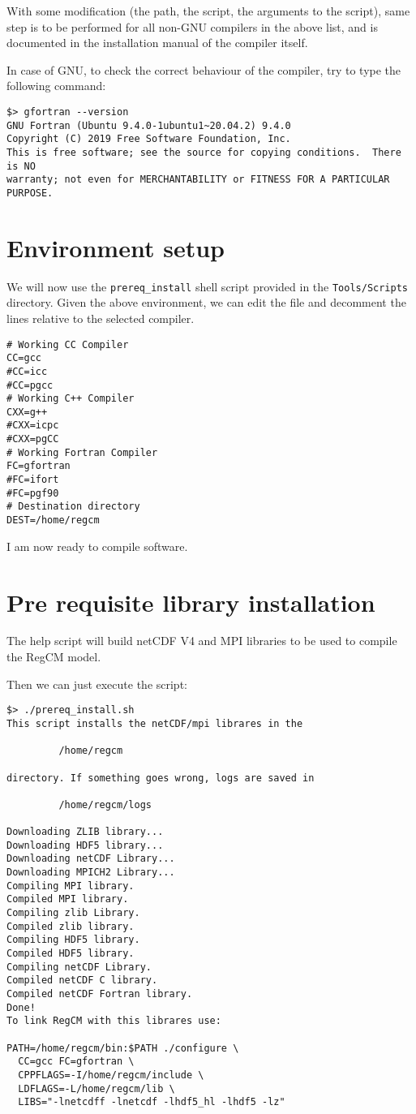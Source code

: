 With some modification (the path, the script, the arguments to the script),
same step is to be performed for all non-GNU compilers in the above list, and
is documented in the installation manual of the compiler itself.

In case of GNU, to check the correct behaviour of the compiler, try to
type the following command:

\begin{Verbatim}
$> gfortran --version
GNU Fortran (Ubuntu 9.4.0-1ubuntu1~20.04.2) 9.4.0
Copyright (C) 2019 Free Software Foundation, Inc.
This is free software; see the source for copying conditions.  There is NO
warranty; not even for MERCHANTABILITY or FITNESS FOR A PARTICULAR PURPOSE.

\end{Verbatim}

\section{Environment setup}

We will now use the \verb=prereq_install= shell script provided in the
\verb=Tools/Scripts= directory. Given the above environment, we can edit
the file and decomment the lines relative to the selected compiler.

\begin{Verbatim}
# Working CC Compiler
CC=gcc
#CC=icc
#CC=pgcc
# Working C++ Compiler
CXX=g++
#CXX=icpc
#CXX=pgCC
# Working Fortran Compiler
FC=gfortran
#FC=ifort
#FC=pgf90
# Destination directory
DEST=/home/regcm
\end{Verbatim}

I am now ready to compile software.

\section{Pre requisite library installation}

The help script will build netCDF V4 and MPI libraries to be used to
compile the RegCM model.

Then we can just execute the script:

\begin{Verbatim}
$> ./prereq_install.sh
This script installs the netCDF/mpi librares in the

         /home/regcm

directory. If something goes wrong, logs are saved in

         /home/regcm/logs

Downloading ZLIB library...
Downloading HDF5 library...
Downloading netCDF Library...
Downloading MPICH2 Library...
Compiling MPI library.
Compiled MPI library.
Compiling zlib Library.
Compiled zlib library.
Compiling HDF5 library.
Compiled HDF5 library.
Compiling netCDF Library.
Compiled netCDF C library.
Compiled netCDF Fortran library.
Done!
To link RegCM with this librares use:

PATH=/home/regcm/bin:$PATH ./configure \
  CC=gcc FC=gfortran \
  CPPFLAGS=-I/home/regcm/include \
  LDFLAGS=-L/home/regcm/lib \
  LIBS="-lnetcdff -lnetcdf -lhdf5_hl -lhdf5 -lz"

\end{Verbatim}

